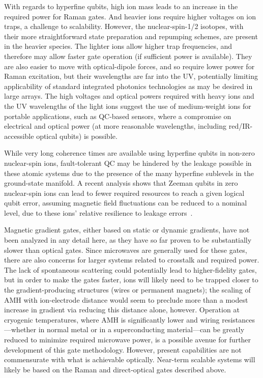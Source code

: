 \documentclass[%
12pt,
 amsmath,amssymb,
]{revtex4-2}
\begin{document}
With regards to hyperfine qubits, high ion mass leads to an increase in the required power for Raman gates.  And heavier ions require higher voltages on ion traps, a challenge to scalability.  However, the nuclear-spin-1/2 isotopes, with their more straightforward state preparation and repumping schemes, are present in the heavier species.  The lighter ions allow higher trap frequencies, and therefore may allow faster gate operation (if sufficient power is available). They are also easier to move with optical-dipole forces, and so require lower power for Raman excitation, but their wavelengths are far into the UV, potentially limiting applicability of standard integrated photonics technologies as may be desired in large arrays.  The high voltages and optical powers required with heavy ions and the UV wavelengths of the light ions suggest the use of medium-weight ions for portable applications, such as QC-based sensors, where a compromise on electrical and optical power (at more reasonable wavelengths, including red/IR-accessible optical qubits) is possible.

While very long coherence times are available using hyperfine qubits in non-zero nuclear-spin ions, fault-tolerant QC may be hindered by the leakage possible in these atomic systems due to the presence of the many hyperfine sublevels in the ground-state manifold.  A recent analysis shows that Zeeman qubits in zero nuclear-spin ions can lead to fewer required resources to reach a given logical qubit error, assuming magnetic field fluctuations can be reduced to a nominal level, due to these ions' relative resilience to leakage errors~\cite{PhysRevA.97.052301_2018}.

Magnetic gradient gates, either based on static or dynamic gradients, have not been analyzed in any detail here, as they have so far proven to be substantially slower than optical gates. Since microwaves are generally used for these gates, there are also concerns for larger systems related to crosstalk and required power. The lack of spontaneous scattering could potentially lead to higher-fidelity gates, but in order to make the gates faster, ions will likely need to be trapped closer to the gradient-producing structures (wires or permanent magnets); the scaling of AMH with ion-electrode distance would seem to preclude more than a modest increase in gradient via reducing this distance alone, however.  Operation at cryogenic temperatures, where AMH is significantly lower and wiring resistances---whether in normal metal or in a superconducting material---can be greatly reduced to minimize required microwave power, is a possible avenue for further development of this gate methodology. However, present capabilities are not commensurate with what is achievable optically.  Near-term scalable systems will likely be based on the Raman and direct-optical gates described above.
\end{document}
